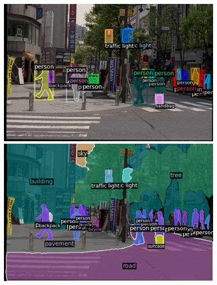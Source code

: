     
    \begin{figure}[!b]
    \centering
    
    \begin{minipage}{1\linewidth}
    \centering
    
    \begin{minipage}[b]{.24\linewidth}
    \includegraphics[width=\linewidth]{vis/success/val_848_det.png}
    \end{minipage}
    \begin{minipage}[b]{.24\linewidth}
    \includegraphics[width=\linewidth]{vis/success/val_848_pan.png}
    \end{minipage}
    \begin{minipage}[b]{.24\linewidth}

\end{minipage}
\end{minipage}
\end{figure}
